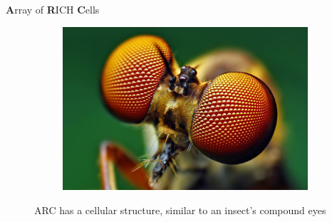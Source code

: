 \documentclass{beamer}
\begin{document}
\begin{frame}{\textbf{A}rray of \textbf{R}ICH \textbf{C}ells}
\begin{figure}
    \hspace{1cm}
    \begin{subfigure}{0.3\textwidth}
      \includegraphics[width = 1.0\textwidth]{Plots/CompoundEyes.jpg}
    \end{subfigure}
    \caption{ARC has a cellular structure, similar to an insect's compound eyes}
  \end{figure}
\end{frame}
\end{document}
